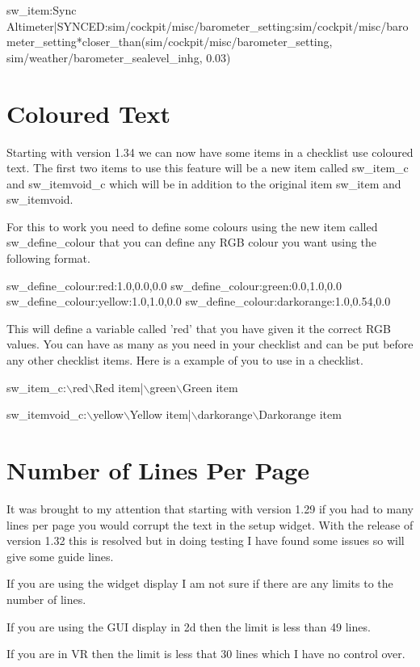 \documentclass[11pt,parskip=half,a4paper]{scrartcl}
\begin{document}
sw\_item:Sync Altimeter|SYNCED:sim/cockpit/misc/barometer\_setting:{sim/cockpit/misc/barometer\_setting}*closer\_than({sim/cockpit/misc/barometer\_setting}, {sim/weather/barometer\_sealevel\_inhg}, 0.03)


\newpage
\section{Coloured Text}

Starting with version 1.34 we can now have some items in a checklist use coloured text. The first two items to use this feature will be a new item called sw\_item\_c and sw\_itemvoid\_c which will be in addition to the original item sw\_item and sw\_itemvoid.

For this to work you need to define some colours using the new item called sw\_define\_colour that you can define any RGB colour you want using the following format.

sw\_define\_colour:red:1.0,0.0,0.0
sw\_define\_colour:green:0.0,1.0,0.0
sw\_define\_colour:yellow:1.0,1.0,0.0
sw\_define\_colour:darkorange:1.0,0.54,0.0

This will define a variable called 'red' that you have given it the correct RGB values. You can have as many as you need in your checklist and can be put before any other checklist items. Here is a example of you to use in a checklist.

sw\_item\_c:$\backslash$red$\backslash$Red item|$\backslash$green$\backslash$Green item

sw\_itemvoid\_c:$\backslash$yellow$\backslash$Yellow item|$\backslash$darkorange$\backslash$Darkorange item


\newpage
\section{Number of Lines Per Page}


It was brought to my attention that starting with version 1.29 if you had to many lines per page you would corrupt the text in the setup widget. With the release of version 1.32 this is resolved but in doing testing I have found some issues so will give some guide lines.

If you are using the widget display I am not sure if there are any limits to the number of lines.

If you are using the GUI display in 2d then the limit is less than 49 lines.

If you are in VR then the limit is less that 30 lines which I have no control over.
\end{document}
